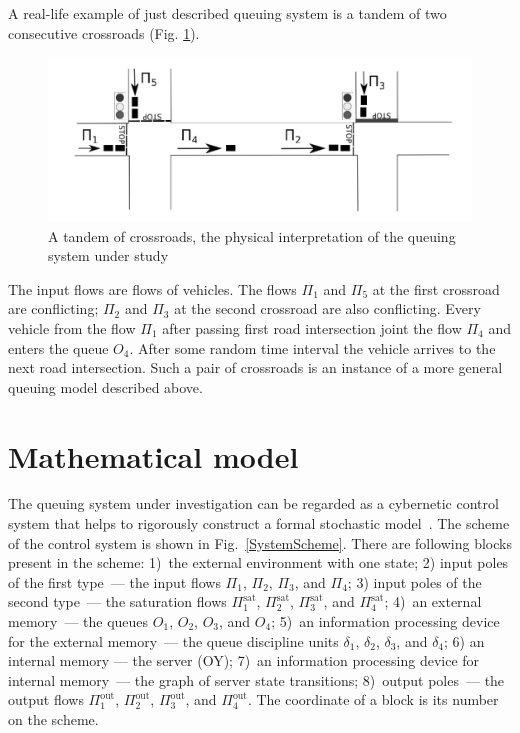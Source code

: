 \documentclass[60x84/16,10pt]{dccn}
\begin{document}
{A real-life example of just described queuing system is a tandem of two consecutive crossroads
(Fig. \ref{crossroads}).
\begin{figure}[b]
   \centering
    \includegraphics[width=\textwidth]{Crossroads.pdf} 
    \caption {A tandem of crossroads, the physical interpretation of the queuing system under study}
    \label{crossroads}
\end{figure}
The input flows are flows of vehicles. The flows $\Pi_1$ and $\Pi_5$ at the first crossroad are
conflicting; $\Pi_2$ and $\Pi_3$ at the second crossroad are also conflicting. Every vehicle from
the flow $\Pi_1$ after passing first road intersection joint the flow $\Pi_4$ and enters the queue
$O_4$. After some random time interval the vehicle arrives to the next road intersection. Such a pair
of crossroads is an instance of a more general queuing model described above.

\section{Mathematical model}
The queuing system under investigation can be regarded as a cybernetic control system that helps to
rigorously construct a formal stochastic model~\cite{z:2012}. The scheme of the control system is
shown in Fig.~\ref{SystemScheme}. There are following blocks present in the scheme: 1)~the external
environment with one state; 2) input poles of the first type~--- the input flows $\Pi_1$, $\Pi_2$,
$\Pi_3$, and $\Pi_4$; 3) input poles of the second type~--- the saturation flows
$\Pi^{\mathrm{\text{sat}}}_1$, $\Pi^{\mathrm{\text{sat}}}_2$, $\Pi^{\mathrm{\text{sat}}}_3$, and
$\Pi^{\mathrm{\text{sat}}}_4$; 4)~an external memory~--- the queues $O_1$, $O_2$, $O_3$, and $O_4$;
5)~an information processing device for the external memory~--- the queue discipline units
$\delta_1$, $\delta_2$, $\delta_3$, and $\delta_4$; 6) an internal memory --- the server (OY); 7)~an
information processing device for internal memory~--- the graph of server state transitions;
8)~output poles~--- the output flows $\Pi^{\mathrm{\text{out}}}_1$, $\Pi^{\mathrm{\text{out}}}_2$,
$\Pi^{\mathrm{\text{out}}}_3$, and $\Pi^{\mathrm{\text{out}}}_4$.  The coordinate of a block is
its number on the scheme.

}
\end{document}
